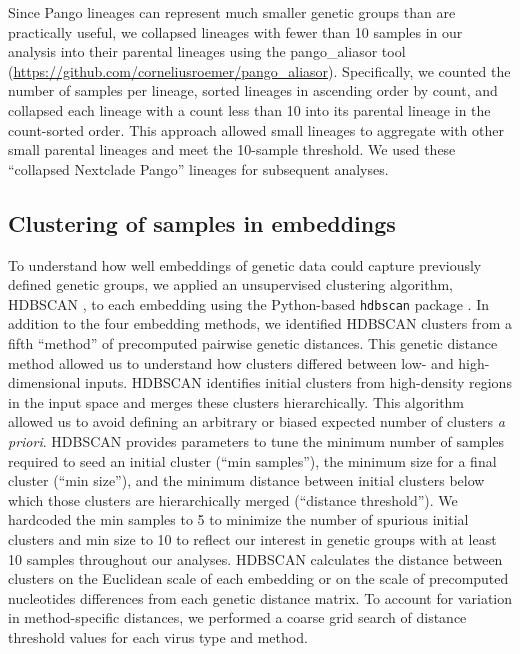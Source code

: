 \documentclass[webpdf,contemporary,large,single]{oup-authoring-template}%
\theoremstyle{thmstyleone}%
\theoremstyle{thmstyletwo}%
\theoremstyle{thmstylethree}%
\begin{document}
Since Pango lineages can represent much smaller genetic groups than are practically useful, we collapsed lineages with fewer than 10 samples in our analysis into their parental lineages using the pango\_aliasor tool (\href{https://github.com/corneliusroemer/pango_aliasor}{https://github.com/corneliusroemer/pango\_aliasor}).
Specifically, we counted the number of samples per lineage, sorted lineages in ascending order by count, and collapsed each lineage with a count less than 10 into its parental lineage in the count-sorted order.
This approach allowed small lineages to aggregate with other small parental lineages and meet the 10-sample threshold.
We used these ``collapsed Nextclade Pango'' lineages for subsequent analyses.

\subsection{Clustering of samples in embeddings}

To understand how well embeddings of genetic data could capture previously defined genetic groups, we applied an unsupervised clustering algorithm, HDBSCAN \citep{campello2015hierarchical}, to each embedding using the Python-based \texttt{hdbscan} package \citep{McInnes2017}.
In addition to the four embedding methods, we identified HDBSCAN clusters from a fifth ``method'' of precomputed pairwise genetic distances.
This genetic distance method allowed us to understand how clusters differed between low- and high-dimensional inputs.
HDBSCAN identifies initial clusters from high-density regions in the input space and merges these clusters hierarchically.
This algorithm allowed us to avoid defining an arbitrary or biased expected number of clusters \emph{a priori}.
HDBSCAN provides parameters to tune the minimum number of samples required to seed an initial cluster (``min samples''), the minimum size for a final cluster (``min size''), and the minimum distance between initial clusters below which those clusters are hierarchically merged (``distance threshold'').
We hardcoded the min samples to 5 to minimize the number of spurious initial clusters and min size to 10 to reflect our interest in genetic groups with at least 10 samples throughout our analyses.
HDBSCAN calculates the distance between clusters on the Euclidean scale of each embedding or on the scale of precomputed nucleotides differences from each genetic distance matrix.
To account for variation in method-specific distances, we performed a coarse grid search of distance threshold values for each virus type and method.
\end{document}
